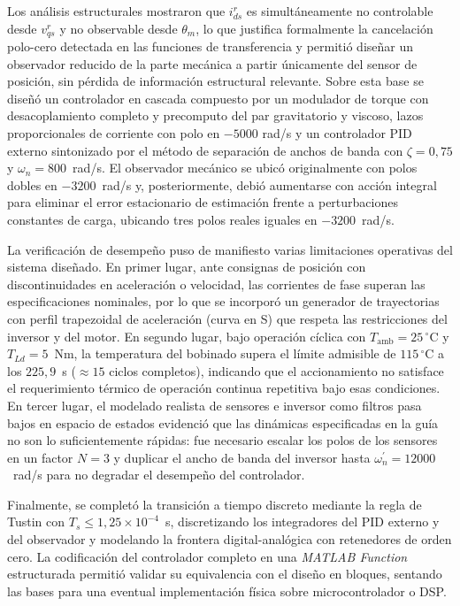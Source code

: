 \documentclass[12pt, a4paper,journal, onecolumn, compsoc]{IEEEtran}
\begin{document}
Los análisis estructurales mostraron que $i_{ds}^{r}$ es simultáneamente no controlable desde $v_{qs}^{r}$ y no observable desde $\theta_m$, lo que justifica formalmente la cancelación polo-cero detectada en las funciones de transferencia y permitió diseñar un observador reducido de la parte mecánica a partir únicamente del sensor de posición, sin pérdida de información estructural relevante. Sobre esta base se diseñó un controlador en cascada compuesto por un modulador de torque con desacoplamiento completo y precomputo del par gravitatorio y viscoso, lazos proporcionales de corriente con polo en $-5000$ rad/s y un controlador PID externo sintonizado por el método de separación de anchos de banda con $\zeta = 0{,}75$ y $\omega_n = 800$~rad/s. El observador mecánico se ubicó originalmente con polos dobles en $-3200$~rad/s y, posteriormente, debió aumentarse con acción integral para eliminar el error estacionario de estimación frente a perturbaciones constantes de carga, ubicando tres polos reales iguales en $-3200$~rad/s.

La verificación de desempeño puso de manifiesto varias limitaciones operativas del sistema diseñado. En primer lugar, ante consignas de posición con discontinuidades en aceleración o velocidad, las corrientes de fase superan las especificaciones nominales, por lo que se incorporó un generador de trayectorias con perfil trapezoidal de aceleración (curva en S) que respeta las restricciones del inversor y del motor. En segundo lugar, bajo operación cíclica con $T_{\mathrm{amb}}=25\,^\circ$C y $T_{Ld}=5$~Nm, la temperatura del bobinado supera el límite admisible de $115\,^\circ$C a los $225{,}9$~s ($\approx 15$ ciclos completos), indicando que el accionamiento no satisface el requerimiento térmico de operación continua repetitiva bajo esas condiciones. En tercer lugar, el modelado realista de sensores e inversor como filtros pasa bajos en espacio de estados evidenció que las dinámicas especificadas en la guía no son lo suficientemente rápidas: fue necesario escalar los polos de los sensores en un factor $N=3$ y duplicar el ancho de banda del inversor hasta $\omega_n^{\prime}=12000$~rad/s para no degradar el desempeño del controlador.

Finalmente, se completó la transición a tiempo discreto mediante la regla de Tustin con $T_s \leq 1{,}25\times 10^{-4}$~s, discretizando los integradores del PID externo y del observador y modelando la frontera digital-analógica con retenedores de orden cero. La codificación del controlador completo en una \textit{MATLAB Function} estructurada permitió validar su equivalencia con el diseño en bloques, sentando las bases para una eventual implementación física sobre microcontrolador o DSP.
\end{document}
